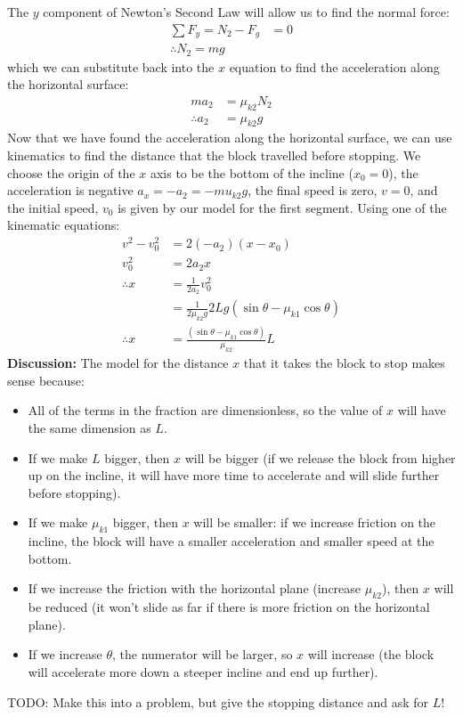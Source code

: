 \begin{example}
The $y$ component of Newton's Second Law will allow us to find the normal force:
\begin{align*}
\sum F_y = N_2 -F_g &=0\\
\therefore N_2 = mg
\end{align*}
which we can substitute back into the $x$ equation to find the acceleration along the horizontal surface:
\begin{align*}
ma_2 &=\mu_{k2}N_2 \\
\therefore a_2&=\mu_{k2}g
\end{align*}
Now that we have found the acceleration along the horizontal surface, we can use kinematics to find the distance that the block travelled before stopping. We choose the origin of the $x$ axis to be the bottom of the incline ($x_0=0$), the acceleration is negative $a_x = -a_2 = -mu_{k2}g$, the final speed is zero, $v=0$, and the initial speed, $v_0$ is given by our model for the first segment. Using one of the kinematic equations:
\begin{align*}
v^2-v_0^2&=2(-a_2)(x-x_0)\\
v_0^2&=2a_2x\\
\therefore x &=\frac{1}{2a_2}v_0^2\\
&=\frac{1}{2\mu_{k2}g}2Lg(\sin\theta-\mu_{k1}\cos\theta)\\
\therefore x&=\frac{(\sin\theta-\mu_{k1}\cos\theta)}{\mu_{k2}}L
\end{align*}
\textbf{Discussion:} The model for the distance $x$ that it takes the block to stop makes sense because:
\begin{itemize}
\item All of the terms in the fraction are dimensionless, so the value of $x$ will have the same dimension as $L$. 
\item If we make $L$ bigger, then $x$ will be bigger (if we release the block from higher up on the incline, it will have more time to accelerate and will slide further before stopping).
\item If we make $\mu_{k1}$ bigger, then $x$ will be smaller: if we increase friction on the incline, the block will have a smaller acceleration and smaller speed at the bottom.
\item If we increase the friction with the horizontal plane (increase $\mu_{k2}$), then $x$ will be reduced (it won't slide as far if there is more friction on the horizontal plane).
\item If we increase $\theta$, the numerator will be larger, so $x$ will increase (the block will accelerate more down a steeper incline and end up further).
\end{itemize} 

TODO: Make this into a problem, but give the stopping distance and ask for $L$!

\end{example}


